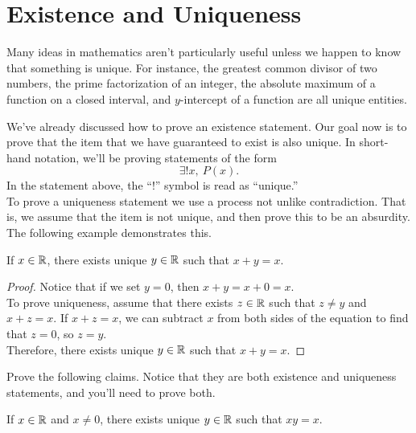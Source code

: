 
\chapter{Existence and Uniqueness}

Many ideas in mathematics aren't particularly useful unless we happen to know that something is unique.  For instance, the greatest common divisor of two numbers, the prime factorization of an integer, the absolute maximum of a function on a closed interval, and $y$-intercept of a function are all unique entities.  
\begin{center}
\end{center}

\noindent We've already discussed how to prove an existence statement.  Our goal now is to prove that the item that we have guaranteed to exist is also unique.  In short-hand notation, we'll be proving statements of the form
\[\exists ! x, \ P(x).\]
In the statement above, the ``!'' symbol is read as ``unique.''\\

\noindent  To prove a uniqueness statement we use a process not unlike contradiction.  That is, we assume that the item is not unique, and then prove this to be an absurdity.  The following example demonstrates this.

\begin{claim}  If $x \in \mathbb{R}$, there exists unique $y\in \mathbb{R}$ such that $x+y=x$.
\end{claim}

\begin{proof}  Notice that if we set $y=0$, then $x+y=x+0=x$.\\

To prove uniqueness, assume that there exists $z \in \mathbb{R}$ such that $z \neq y$ and $x+z=x$.  If $x+z=x$, we can subtract $x$ from both sides of the equation to find that $z=0$, so $z=y$.  \\

Therefore, there exists unique $y \in \mathbb{R}$ such that $x+y = x$.
\end{proof}

\begin{question}
\item Prove the following claims.  Notice that they are both existence and uniqueness statements, and you'll need to prove both.
\end{question}
\begin{claim}  If $x \in \mathbb{R}$ and $x \neq 0$, there exists unique $y \in \mathbb{R}$ such that $xy=x$.
\end{claim}

